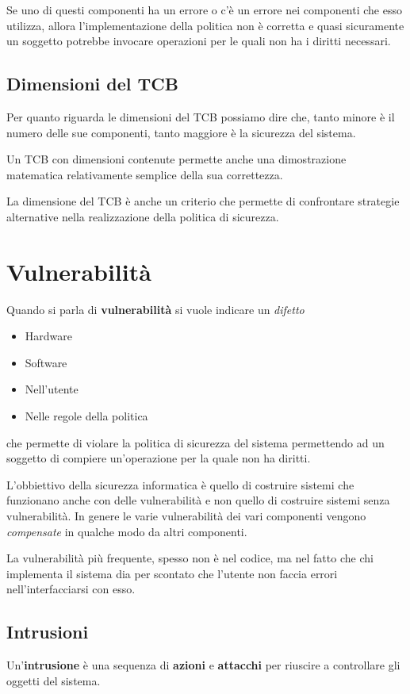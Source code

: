 Se uno di questi componenti ha un errore o c'è un errore nei componenti che esso utilizza, allora l'implementazione
della politica non è corretta e quasi sicuramente un soggetto potrebbe invocare operazioni per le quali non ha i
diritti necessari.

\subsection{Dimensioni del TCB}
Per quanto riguarda le dimensioni del TCB possiamo dire che, tanto minore è il numero delle sue componenti, tanto
maggiore è la sicurezza del sistema.

Un TCB con dimensioni contenute permette anche una dimostrazione matematica relativamente semplice della sua
correttezza.

La dimensione del TCB è anche un criterio che permette di confrontare strategie alternative nella realizzazione della
politica di sicurezza.

\section{Vulnerabilità}
Quando si parla di \textbf{vulnerabilità} si vuole indicare un \emph{difetto}
\begin{itemize}
	\item Hardware
	\item Software
	\item Nell'utente
	\item Nelle regole della politica
\end{itemize}
che permette di violare la politica di sicurezza del sistema permettendo ad un soggetto di compiere un'operazione per
la quale non ha diritti.

L'obbiettivo della sicurezza informatica è quello di costruire sistemi che funzionano anche con delle vulnerabilità
e non quello di costruire sistemi senza vulnerabilità. In genere le varie vulnerabilità dei vari componenti vengono
\emph{compensate} in qualche modo da altri componenti.

La vulnerabilità più frequente, spesso non è nel codice, ma nel fatto che chi implementa il sistema dia per scontato
che l'utente non faccia errori nell'interfacciarsi con esso.

\subsection{Intrusioni}
Un'\textbf{intrusione} è una sequenza di \textbf{azioni} e \textbf{attacchi} per riuscire a controllare gli oggetti
del sistema.

